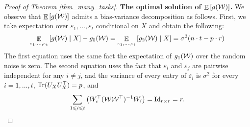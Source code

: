 \begin{proof}[Proof of Theorem \ref{thm_many_tasks}]
	\medskip
	\noindent\textbf{The optimal solution of $\mathop{\mathbb{E}}\left[ g({\mathcal W}) \right]$.}
	We observe that $\mathop{\mathbb{E}}\left[ g({\mathcal W}) \right]$ admits a bias-variance decomposition as follows.
	First, we take expectation over $\varepsilon_1, \dots, \varepsilon_t$ conditional on $X$ and obtain the following:
	\begin{align}
		\mathop{\mathbb{E}}_{\varepsilon_1, \dots, \varepsilon_t}\left[ g({\mathcal W}) \mid X \right] - g_0({\mathcal W})
		= \mathop{\mathbb{E}}_{\varepsilon_1, \dots, \varepsilon_t}\left[ g_2({\mathcal W}) \mid X \right]
		= \sigma^2(n\cdot t - p\cdot r) \nonumber
	\end{align}
	The first equation uses the same fact the expectation of $g_1({\mathcal W})$ over the random noise is zero.
	The second equation uses the fact that $\varepsilon_i$ and $\varepsilon_j$ are pairwise independent for any $i \neq j$, and the variance of every entry of $\varepsilon_i$ is $\sigma^2$ for every $i = 1,\dots, t$, $\operatorname{Tr}(U_X U_X^\top)=p$, and
		\[ \sum_{1\leqslant i\leqslant t} \left({W_i^{\top} ({\mathcal W} {\mathcal W}^{\top})^{-1} W_i}\right)
			= \operatorname{Id}_{r\times r} = r. \]

\end{proof}
